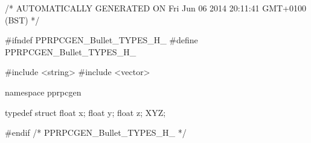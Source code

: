\begin{code}
/* AUTOMATICALLY GENERATED ON Fri Jun 06 2014 20:11:41 GMT+0100 (BST) */

#ifndef PPRPCGEN_Bullet_TYPES_H_
#define PPRPCGEN_Bullet_TYPES_H_

#include <string>
#include <vector>

namespace pprpcgen{

typedef struct {
  float x;
  float y;
  float z;
} XYZ;

}

#endif /* PPRPCGEN_Bullet_TYPES_H_ */

\end{code}




